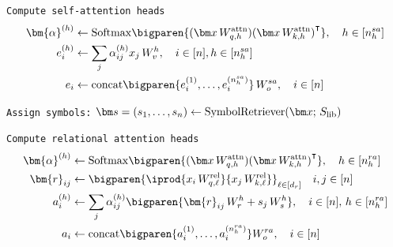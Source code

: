 \begin{algorithm}[ht]
	\caption{Dual Attention}\label{alg:dual_head_attn}

    \vspace{1em}

    \texttt{Compute self-attention heads}
    \begin{align*}
        \bm{\alpha}^{(h)} &\gets \Softmax\bigparen{{(\x \, \Wqattnn{h})} {(\x \, \Wkattnn{h})}^\intercal}, \quad h \in [\nhsa] \\
        e_i^{(h)} &\gets \sum_{j} \alpha_{ij}^{(h)} x_j \, W_v^h, \quad i \in [n], h \in [\nhsa]\\
        e_i &\gets \concat\bigparen{e_i^{(1)}, \ldots, e_i^{(\nhsa)}} \, W_o^{sa}, \quad i \in [n]
    \end{align*}

    \texttt{Assign symbols:} $\s = (s_1, \ldots, s_n) \gets \SymbolRetriever(\x;\,\Slib)$
    \vspace{0.5em}

    \texttt{Compute relational attention heads}
    \begin{align*}
        \bm{\alpha}^{(h)} &\gets \Softmax\bigparen{{(\x \, \Wqattnn{h})} {(\x \, \Wkattnn{h})}^\intercal}, \quad h \in [\nhra] \\
        \bm{r}_{ij} &\gets \bigparen{\iprod{x_i \, \Wqrell{\ell}}{x_j \, \Wkrell{\ell}}}_{\ell \in [d_r]} \quad i,j \in [n] \\
        a_i^{(h)} &\gets \sum_{j} \alpha_{ij}^{(h)} \bigparen{\bm{r}_{ij}\,W_r^h + s_j \, W_s^{h}}, \quad i \in [n],\, h \in [\nhra]\\
        a_i &\gets \concat\bigparen{a_i^{(1)}, \ldots, a_i^{(\nhra)}} W_o^{ra}, \quad i \in [n]
    \end{align*}


\end{algorithm}

